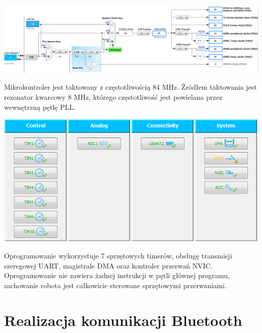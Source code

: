 \documentclass[eng,printmode]{mgr}
\begin{document}
   \begin{center}
    \includegraphics[width=1\textwidth]{images/clock}
   \end{center}

Mikrokontroler jest taktowany z częstotliwością 84 MHz. Źródłem taktowania jest rezonator kwarcowy 8 MHz, którego częstotliwość jest powielana  przez wewnętrzną pętlę PLL. 

   \begin{center}
    \includegraphics[width=1\textwidth]{images/uC_config}
   \end{center}

Oprogramowanie wykorzystuje 7 sprzętowych timerów, obsługę transmisji szeregowej UART, magistrale DMA oraz kontroler przerwań NVIC. Oprogramowanie nie zawiera żadnej instrukcji w pętli głównej programu, zachowanie robota jest całkowicie sterowane sprzętowymi przerwaniami. 

 \section{Realizacja komunikacji Bluetooth}
\end{document}
